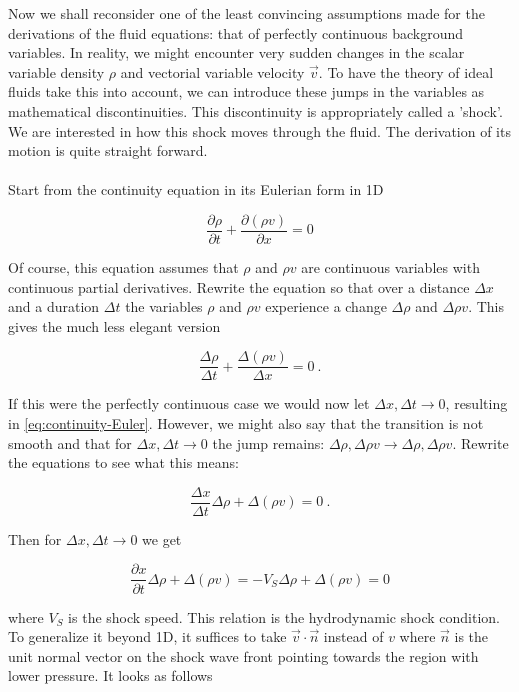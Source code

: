 Now we shall reconsider one of the least convincing assumptions made for the derivations of the fluid equations: that of perfectly continuous background variables. In reality, we might encounter very sudden changes in the scalar variable density $\rho$ and vectorial variable velocity $\vec{v}$. To have the theory of ideal fluids take this into account, we can introduce these jumps in the variables as mathematical discontinuities. This discontinuity is appropriately called a 'shock'. We are interested in how this shock moves through the fluid. The derivation of its motion is quite straight forward.\\
\\
Start from the continuity equation in its Eulerian form in 1D

\begin{equation}
\label{eq:continuity-Euler}
\frac{\partial \rho}{\partial t} + \frac{\partial(\rho v)}{\partial x} = 0
\end{equation}

Of course, this equation assumes that $\rho$ and $\rho v$ are continuous variables with continuous partial derivatives. Rewrite the equation so that over a distance $\Delta x$ and a duration $\Delta t$ the variables $\rho$ and $\rho v$ experience a change $\Delta\rho$ and $\Delta \rho v$. This gives the much less elegant version 

$$ \frac{\Delta \rho}{\Delta t} + \frac{\Delta(\rho v)}{\Delta x} = 0 \ . $$

If this were the perfectly continuous case we would now let $\Delta x, \Delta t \to 0$, resulting in \cref{eq:continuity-Euler}. However, we might also say that the transition is not smooth and that for $\Delta x, \Delta t \to 0$ the jump remains: $ \Delta \rho, \Delta \rho v \to \Delta \rho, \Delta \rho v $. Rewrite the equations to see what this means:

$$ \frac{\Delta x}{\Delta t} \Delta \rho + \Delta(\rho v) = 0 \ . $$

Then for $\Delta x, \Delta t \to 0$ we get 

\begin{equation}
\label{eq:HD-shock-condition}
\frac{\partial x}{\partial t} \Delta \rho + \Delta(\rho v) = -V_S \Delta \rho + \Delta(\rho v) = 0
\end{equation}

where $V_S$ is the shock speed. This relation is the hydrodynamic shock condition. To generalize it beyond 1D, it suffices to take $\vec{v} \cdot \vec{n}$ instead of $v$ where $\vec{n}$ is the unit normal vector on the shock wave front pointing towards the region with lower pressure. It looks as follows

